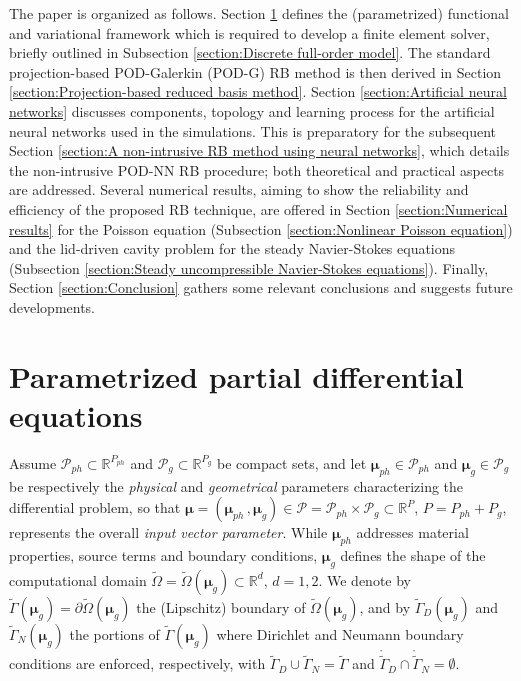 \documentclass{elsarticle}
\numberwithin{equation}{section}
\theoremstyle{theorem}
\theoremstyle{definition}
\theoremstyle{remark}
\theoremstyle{proposition}
\numberwithin{figure}{section}
\newcommand{\wt}[1]{\widetilde{#1}}
\newcommand{\bg}[1]{\boldsymbol{#1}}
\begin{document}
		The paper is organized as follows. Section \ref{section:Parametrized partial differential equations} defines the (parametrized) functional and variational framework which is required to develop a finite element solver, briefly outlined in Subsection \ref{section:Discrete full-order model}. The standard projection-based POD-Galerkin (POD-G) RB method is then derived in Section \ref{section:Projection-based reduced basis method}. Section \ref{section:Artificial neural networks} discusses components, topology and learning process for the artificial neural networks used in the simulations. This is preparatory for the subsequent Section \ref{section:A non-intrusive RB method using neural networks}, which details the non-intrusive POD-NN RB procedure; both theoretical and practical aspects are addressed. Several numerical results, aiming to show the reliability and efficiency of the proposed RB technique, are offered in Section \ref{section:Numerical results} for the Poisson equation (Subsection \ref{section:Nonlinear Poisson equation}) and the lid-driven cavity problem for the steady Navier-Stokes equations (Subsection \ref{section:Steady uncompressible Navier-Stokes equations}). Finally, Section \ref{section:Conclusion} gathers some relevant conclusions and suggests future developments.
		
		
		
	\section{Parametrized partial differential equations}
	\label{section:Parametrized partial differential equations}
	
		Assume $\mathcal{P}_{ph} \subset \mathbb{R}^{P_{ph}}$ and $\mathcal{P}_g \subset \mathbb{R}^{P_{g}}$ be compact sets, and let $\boldsymbol{\mu}_{ph} \in \mathcal{P}_{ph}$ and $\boldsymbol{\mu}_{g} \in \mathcal{P}_{g}$ be respectively the \emph{physical} and \emph{geometrical} parameters characterizing the differential problem, so that $\boldsymbol{\mu} = (\boldsymbol{\mu}_{ph} \, , \boldsymbol{\mu}_{g}) \in \mathcal{P} = \mathcal{P}_{ph} \times \mathcal{P}_g \subset \mathbb{R}^P$, $P = P_{ph} + P_g$, represents the overall \emph{input vector parameter}. While $\bg{\mu}_{ph}$ addresses material properties, source terms and boundary conditions, $\bg{\mu}_g$ defines the shape of the computational domain $\wt{\Omega} = \wt{\Omega}(\boldsymbol{\mu}_g) \subset \mathbb{R}^d$, $d = 1,2$. We denote by $\wt{\Gamma}(\boldsymbol{\mu}_g) = \partial \wt{\Omega}(\boldsymbol{\mu}_g)$ the (Lipschitz) boundary of $\wt{\Omega}(\boldsymbol{\mu}_g)$, and by $\wt{\Gamma}_D(\boldsymbol{\mu}_g)$ and $\wt{\Gamma}_N(\boldsymbol{\mu}_g)$ the portions of $\wt{\Gamma}(\boldsymbol{\mu}_g)$ where Dirichlet and Neumann boundary conditions are enforced, respectively, with $\wt{\Gamma}_D \cup \wt{\Gamma}_N = \wt{\Gamma}$ and $\mathring{\wt{\Gamma}}_D \cap \mathring{\wt{\Gamma}}_N = \emptyset$.
		
\end{document}
